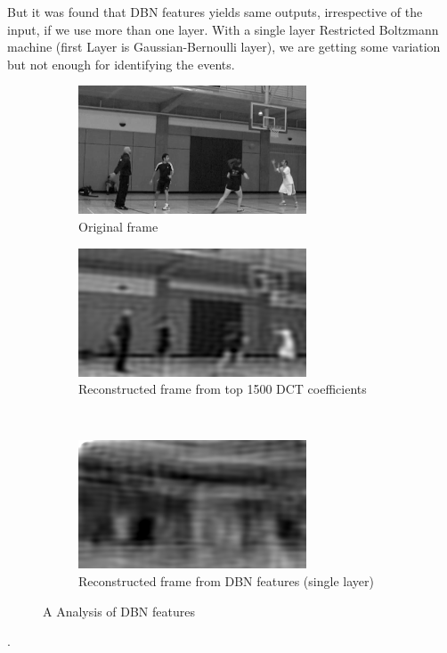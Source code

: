 But it was found that DBN features yields same outputs, irrespective of the input, if we use more than one layer. With a single layer Restricted Boltzmann machine (first Layer is Gaussian-Bernoulli layer), we are getting some variation but not enough for identifying the events.\\


\begin{figure}
        \centering
        \begin{subfigure}[b]{\textwidth}
        			\centering
                \includegraphics[scale=1]{./imgs/Original.png}
                \caption{Original frame}
                \label{fig:original}
        \end{subfigure}%
        
        \begin{subfigure}[b]{0.45\textwidth}
        		\centering
        		\includegraphics[scale=1]{./imgs/DCT.png}
        		\caption{Reconstructed frame from top 1500 DCT coefficients}
        		\label{fig:dct}
        \end{subfigure}
        ~%
        \begin{subfigure}[b]{0.45\textwidth}
        			\centering
                \includegraphics[scale=1]{./imgs/DBN.png}
                \caption{Reconstructed frame from DBN features (single layer)}
                \label{fig:dbn}
        \end{subfigure}
        \caption{ A Analysis of DBN features}
        \label{fig:dct+dbn}
\end{figure}.

